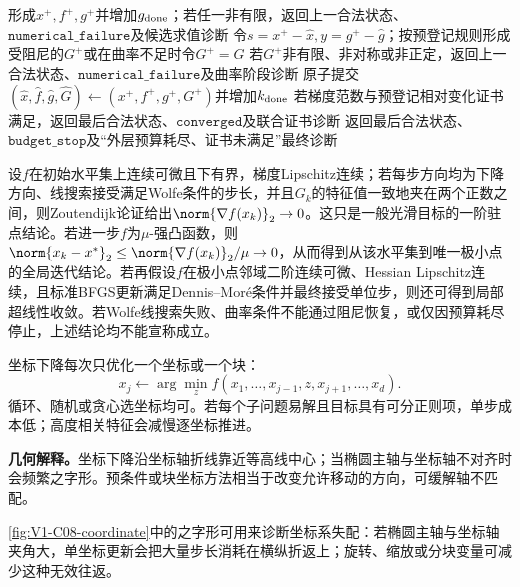 \begin{AlgorithmContract}
\begin{algorithm}[H]
{  形成$x^+,f^+,g^+$并增加$g_{\rm done}$；若任一非有限，返回上一合法状态、$\mathtt{numerical\_failure}$及候选求值诊断\;
  令$s=x^+-\widehat x,y=g^+-\widehat g$；按预登记规则形成受阻尼的$G^+$或在曲率不足时令$G^+=\widehat G$\;
  若$G^+$非有限、非对称或非正定，返回上一合法状态、$\mathtt{numerical\_failure}$及曲率阶段诊断\;
  原子提交$(\widehat x,\widehat f,\widehat g,\widehat G)\leftarrow(x^+,f^+,g^+,G^+)$并增加$k_{\rm done}$\;
  若梯度范数与预登记相对变化证书满足，返回最后合法状态、$\mathtt{converged}$及联合证书诊断\;
}
返回最后合法状态、$\mathtt{budget\_stop}$及“外层预算耗尽、证书未满足”最终诊断\;
\end{algorithm}
\end{AlgorithmContract}

\begin{theorem}[BFGS结论的适用层次]
设$f$在初始水平集上连续可微且下有界，梯度Lipschitz连续；若每步方向均为下降方向、线搜索接受满足Wolfe条件的步长，并且$G_k$的特征值一致地夹在两个正数之间，则Zoutendijk论证给出$\norm{\nabla f(x_k)}_2\to0$。这只是一般光滑目标的一阶驻点结论。若进一步$f$为$\mu$-强凸函数，则
$\norm{x_k-x^*}_2\le\norm{\nabla f(x_k)}_2/\mu\to0$，从而得到从该水平集到唯一极小点的全局迭代结论。若再假设$f$在极小点邻域二阶连续可微、Hessian Lipschitz连续，且标准BFGS更新满足Dennis--Mor\'e条件并最终接受单位步，则还可得到局部超线性收敛。若Wolfe线搜索失败、曲率条件不能通过阻尼恢复，或仅因预算耗尽停止，上述结论均不能宣称成立。
\end{theorem}


坐标下降每次只优化一个坐标或一个块：
\[
x_j\leftarrow\arg\min_z f(x_1,\ldots,x_{j-1},z,x_{j+1},\ldots,x_d).
\]
循环、随机或贪心选坐标均可。若每个子问题易解且目标具有可分正则项，单步成本低；高度相关特征会减慢逐坐标推进。

\label{struct:V1-C08-CH16}
\begin{geometrybox}
\textbf{几何解释。}坐标下降沿坐标轴折线靠近等高线中心；当椭圆主轴与坐标轴不对齐时会频繁之字形。预条件或块坐标方法相当于改变允许移动的方向，可缓解轴不匹配。
\end{geometrybox}

\label{struct:V1-C08-CH19}

\cref{fig:V1-C08-coordinate}中的之字形可用来诊断坐标系失配：若椭圆主轴与坐标轴夹角大，单坐标更新会把大量步长消耗在横纵折返上；旋转、缩放或分块变量可减少这种无效往返。


